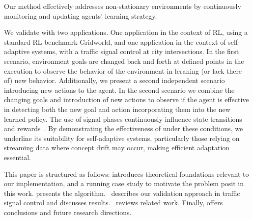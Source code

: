 Our method effectively addresses non-stationary environments by continuously monitoring and 
updating agents' learning strategy. 

We validate \adaptiverl with two applications. One application in the context of \ac{RL}, using a 
standard \ac{RL} benchmark Gridworld, and one application in the context of self-adaptive systems, 
with a traffic signal control at city intersections. In the first scenario, environment goals are changed 
back and forth at defined points in the execution to observe the behavior of the environment in leraning 
(or lack there of) new behavior. Additionally, we present a second independent scenario introducing 
new actions to the agent. In the second scenario we combine the changing goals and introduction of 
new actions to observe if the agent is effective in detecting both the new goal and action incorporating 
them into the new learned policy. The use of signal phases continuously influence state transitions and 
rewards~\cite{meta-rl-traffic}. By demonstrating the effectiveness of \adaptiverl under these conditions, 
we underline its suitability for self-adaptive systems, particularly those relying on streaming data where 
concept drift may occur, making efficient adaptation essential.

This paper is structured as follows:  introduces theoretical foundations relevant to 
our implementation, and a running case study to motivate the problem posit in this work.  presents the \adaptiverl algorithm.~ describes our validation approach in traffic signal control and discusses results.~ reviews related work. Finally,  offers conclusions and future research directions.





\endinput


